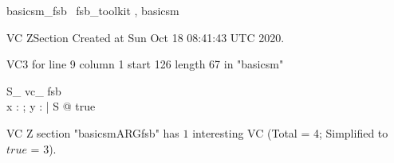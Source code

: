 \documentclass{article}
\begin{document}

\begin{zsection}	 \SECTION basicsm\_fsb \parents~fsb\_toolkit , basicsm
\end{zsection}

VC ZSection Created at Sun Oct 18 08:41:43 UTC 2020.

VC3 for line 9 column 1 start 126 length 67 in "basicsm"
\begin{theorem}{ S\_ vc\_ fsb}\\
 \exists x : \nat ; y : \nat | S @ true \\

\end{theorem}



 VC Z section "basicsmARGfsb" has $1$ interesting VC (Total = 4; Simplified to $true$ = 3).



\end{document}
